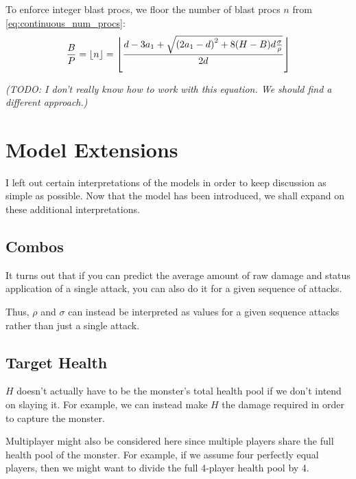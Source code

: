 \documentclass{article}
\begin{document}
To enforce integer blast procs, we floor the number of blast procs $n$ from \eqref{eq:continuous_num_procs}:
\begin{equation}
    \frac{B}{P}
    = \floor*{n}
    = \floor*{\frac{d - 3 a_1 + \sqrt{\parens*{2 a_1 - d}^2 + 8 \parens*{H - B} d \frac{\sigma}{\rho}}}{2 d}}
\end{equation}

\textit{(TODO: I don't really know how to work with this equation. We should find a different approach.)}


\newpage


\section{Model Extensions}%
\label{sec:model_extensions}

I left out certain interpretations of the models in order to keep discussion as simple as possible. Now that the model has been introduced, we shall expand on these additional interpretations.

\subsection{Combos}%
\label{sub:combos}

It turns out that if you can predict the average amount of raw damage and status application of a single attack, you can also do it for a given sequence of attacks.

Thus, $\rho$ and $\sigma$ can instead be interpreted as values for a given sequence attacks rather than just a single attack.

\subsection{Target Health}%
\label{sub:target_health}

$H$ doesn't actually have to be the monster's total health pool if we don't intend on slaying it. For example, we can instead make $H$ the damage required in order to capture the monster.

Multiplayer might also be considered here since multiple players share the full health pool of the monster. For example, if we assume four perfectly equal players, then we might want to divide the full 4-player health pool by 4.
\end{document}
